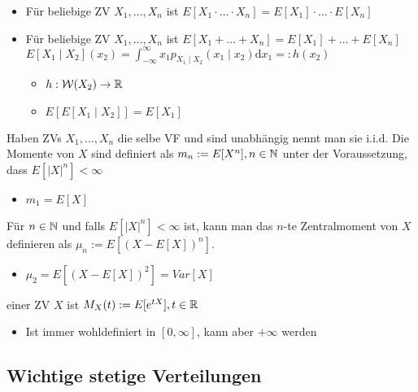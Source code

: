 \begin{itemize}
\begin{itemize}
            \item Für beliebige ZV $X_1, \dots, X_n$ ist $E[X_1 \cdot \dots \cdot X_n] = E[X_1] \cdot \dots \cdot E[X_n]$
            \item Für beliebige ZV $X_1, \dots, X_n$ ist $E[X_1 + \dots + X_n] = E[X_1] + \dots + E[X_n]$
             $E[X_1 \mid X_2](x_2) = \int_{-\infty}^\infty x_1 p_{X_1 \mid X_2} (x_1 \mid x_2) \mathrm{d}x_1 =: h(x_2)$
            \begin{itemize}
                \item $h : \mathcal{W}(X_2) \to \mathbb{R}$
                \item $E[E[X_1 \mid X_2]] = E[X_1]$
            \end{itemize}
        \end{itemize}
     Haben ZVs $X_1, \dots, X_n$ die selbe VF und sind unabhängig nennt man sie i.i.d.
     Die Momente von $X$ sind definiert als $m_n := E[X^n], n \in \mathbb{N}$ unter der Voraussetzung, dass $E[|X|^n] < \infty$
        \begin{itemize}
            \item $m_1 = E[X]$
        \end{itemize}
     Für $n \in \mathbb{N}$ und falls $E[|X|^n] < \infty$ ist, kann man das $n$-te Zentralmoment von $X$ definieren als $\mu_n := E[(X - E[X])^n]$.
        \begin{itemize}
            \item $\mu_2 = E[(X - E[X])^2] = Var[X]$
        \end{itemize}
     einer ZV $X$ ist $M_X(t) := E[e^{tX}], t \in \mathbb{R}$
        \begin{itemize}
            \item Ist immer wohldefiniert in $[0, \infty]$, kann aber $+\infty$ werden
        \end{itemize}
\end{itemize}

\subsection{Wichtige stetige Verteilungen}
